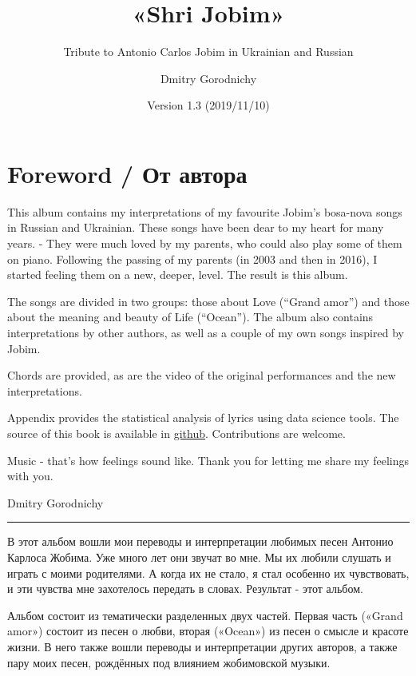 \documentclass[
]{article}
\title{«Shri Jobim»}
\subtitle{Tribute to Antonio Carlos Jobim in Ukrainian and Russian}
\author{Dmitry Gorodnichy}
\date{Version 1.3 (2019/11/10)}
\begin{document}
\maketitle

{
\setcounter{tocdepth}{2}
\tableofcontents
}
\hypertarget{foreword-ux43eux442-ux430ux432ux442ux43eux440ux430}{%
\section*{Foreword / От автора}\label{foreword-ux43eux442-ux430ux432ux442ux43eux440ux430}}

This album contains my interpretations of my favourite Jobim's bosa-nova songs in Russian and Ukrainian.
These songs have been dear to my heart for many years. -
They were much loved by my parents, who could also play some of them on piano.
Following the passing of my parents (in 2003 and then in 2016), I started feeling them on a new, deeper, level.
The result is this album.

The songs are divided in two groups: those about Love (``Grand amor'') and those about the meaning and beauty of Life (``Ocean'').
The album also contains interpretations by other authors,
as well as a couple of my own songs inspired by Jobim.

Chords are provided, as are the video of the original performances and the new interpretations.

Appendix provides the statistical analysis of lyrics using data science tools. The source of this book is available in \href{https://github.com/gorodnichy/Shri-Jobim}{github}. Contributions are welcome.

Music - that's how feelings sound like.
Thank you for letting me share my feelings with you.

Dmitry Gorodnichy

\begin{center}\rule{0.5\linewidth}{0.5pt}\end{center}

В этот альбом вошли мои переводы и интерпретации любимых песен Антонио Карлоса Жобима.
Уже много лет они звучат во мне. Мы их любили слушать и играть с моими родителями. А когда их не стало, я стал особенно их чувствовать, и эти чувства мне захотелось передать в словах. Результат - этот альбом.

Альбом состоит из тематически разделенных двух частей. Первая часть («Grand amor») состоит из песен о любви, вторая («Ocean») из песен о смысле и красоте жизни.
В него также вошли переводы и интерпретации других авторов,
а также пару моих песен, рождённых под влиянием жобимовской музыки.
\end{document}
